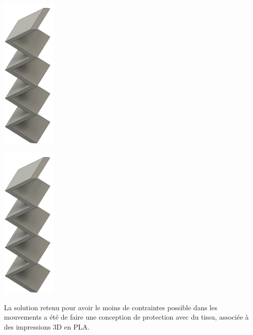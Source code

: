 \begin{minipage}[c]{0.48\textwidth}
    \begin{center}
        \includegraphics[width=0.2\textwidth]{assets/figures/Protections_laser/Securite_mecanique/Protection_vers_microscope/zigzag_model.jpeg}
    \end{center}
    \label{zigzag_model}
\end{minipage}\hfill
\begin{minipage}[c]{0.48\textwidth}
    \begin{center}
        \includegraphics[width=0.2\textwidth]{assets/figures/Protections_laser/Securite_mecanique/Protection_vers_microscope/zigzag_model.jpeg}
    \end{center}
    \label{zigzag_reel}
\end{minipage}

La solution retenu pour avoir le moins de contraintes possible dans les mouvements a été de faire une conception de protection avec du tissu, associée à des impressions 3D en PLA.

